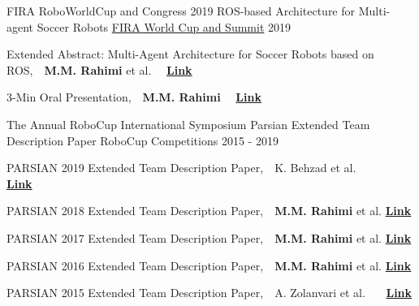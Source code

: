 

\begin{cventries}
  \cventry
    {FIRA RoboWorldCup and Congress 2019} %
    {ROS-based Architecture for Multi-agent Soccer Robots} %
    {\href{https://easychair.org/cfp/fira2019}{FIRA World Cup and Summit}} %
    {2019} %
    {
      \begin{cvitems} %
        \item {Extended Abstract: Multi-Agent Architecture for Soccer Robots based on ROS,~~\textbf{M.M. Rahimi} et al.~~ \href{https://www.researchgate.net/publication/335276487_Extended_Abstract_Multi-Agent_Architecture_for_Soccer_Robots_based_on_ROS}{\textbf{Link}}}
        \item {3-Min Oral Presentation,~~\textbf{M.M. Rahimi}~~ \href{https://www.researchgate.net/publication/336278713_ROS-based_Architecture_for_Multi-Agent_Soccer_Robots}{\textbf{Link}}}
      \end{cvitems}
    }


  \cventry
    {The Annual RoboCup International Symposium} %
    {Parsian Extended Team Description Paper} %
    {RoboCup Competitions} %
    {2015 - 2019} %
    {
      \begin{cvitems} %
        \item {PARSIAN 2019 Extended Team Description Paper,~~K. Behzad et al. ~~~~~ \href{https://ssl.robocup.org/wp-content/uploads/2019/01/2019_ETDP_Parsian.pdf}{\textbf{Link}}}
        \item {PARSIAN 2018 Extended Team Description Paper,~~\textbf{M.M. Rahimi} et al. \href{https://ssl.robocup.org/wp-content/uploads/2019/01/2018_ETDP_Parsian.pdf}{\textbf{Link}}}
        \item {PARSIAN 2017 Extended Team Description Paper,~~\textbf{M.M. Rahimi} et al. \href{https://www.robocup2017.org/file/symposium/soccer_sml_size/Robocupssl2017-final14.pdf}{\textbf{Link}}}
        \item {PARSIAN 2016 Extended Team Description Paper,~~\textbf{M.M. Rahimi} et al. \href{https://ssl.robocup.org/wp-content/uploads/2019/01/2016_ETDP_Parsian.pdf}{\textbf{Link}}}
        \item {PARSIAN 2015 Extended Team Description Paper,~~A. Zolanvari et al. ~~~\href{https://ssl.robocup.org/wp-content/uploads/2019/01/2015_TDP_Parsian.pdf}{\textbf{Link}}}
      \end{cvitems}
    }
  

\end{cventries}
